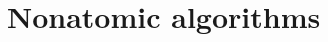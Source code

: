 \documentclass{article}
\begin{document}
\section{Nonatomic algorithms}
\label{sec:nonatomic}

\end{document}

